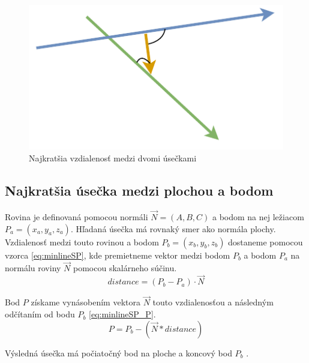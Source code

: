 \begin{figure}[H]
	\centering
	\includegraphics[height=0.3\textwidth]{obrazky-figures/Diagram/Draw/2Line/DP Navrh operacii-1D - LineMinLL.pdf}
	\caption{Najkratšia vzdialenosť medzi dvomi úsečkami}
	\label{fig:LineMinLL}
\end{figure}


\subsection*{Najkratšia úsečka medzi plochou a bodom}


Rovina je definovaná pomocou normáli $\overrightarrow{N}=(A, B, C)$ a bodom na nej ležiacom $P_a=(x_a,y_a,z_a)$.
Hľadaná úsečka má rovnaký smer ako normála plochy.
Vzdialenosť medzi touto rovinou a bodom $P_b=(x_b,y_b,z_b)$ dostaneme pomocou vzorca \ref{eq:minlineSP}, kde premietneme vektor medzi bodom $P_b$ a bodom $P_a$ na normálu roviny $\overrightarrow{N}$ pomocou skalárneho súčinu. 
\begin{equation}
 distance = (P_b - P_a) \cdot \overrightarrow{N}
    \label{eq:minlineSP}
\end{equation}

Bod $P$ získame vynásobením vektora $\overrightarrow{N}$ touto vzdialenosťou a následným odčítaním od bodu $P_b$ \ref{eq:minlineSP_P}.
\begin{equation}
 P = P_b - (\overrightarrow{N} * distance)
    \label{eq:minlineSP_P}
\end{equation}

Výsledná úsečka má počiatočný bod na ploche a koncový bod $P_b$ \cite{bourke_Point_Line_Plane}.





